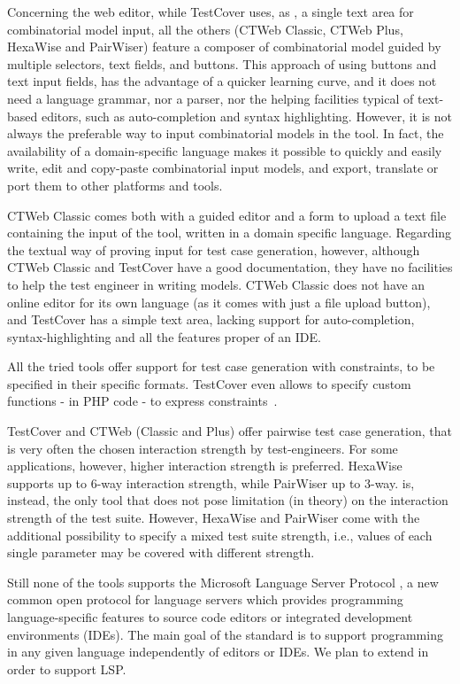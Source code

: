\begin{tikzborder}{\cite{Gargantini16:validation}}
\begin{tikzborder}{\cite{gargantini_combinatorial_2017}}
\begin{tikzborder}{\cite{garn2019}}
\begin{tikzborder}{\cite{arcaini2019achieving}}
\begin{tikzborder}{}
Concerning the web editor, while TestCover uses, as \ctwedge, a single text area for combinatorial model input,  all the others (CTWeb Classic, CTWeb Plus, HexaWise and PairWiser) feature a composer of combinatorial model guided by multiple selectors, text fields, and buttons. This approach of using buttons and text input fields, has the advantage of a quicker learning curve, and it does not need a language grammar, nor a parser, nor the helping facilities typical of text-based editors, such as auto-completion and syntax highlighting. However, it is not always the preferable way to input combinatorial models in the tool. In fact, the availability of a domain-specific language makes it possible to quickly and easily write, edit and copy-paste combinatorial input models, and export, translate or port them to other platforms and tools.


CTWeb Classic comes both with a guided editor and a form to upload a text file containing the input of the tool, written in a domain specific language. Regarding the textual way of proving input for test case generation, however, although CTWeb Classic and TestCover have a good documentation, they have no facilities to help the test engineer in writing models. CTWeb Classic does not have an online editor for its own language (as it comes with just a file upload button), and TestCover has a simple text area, lacking support for auto-completion, syntax-highlighting and all the features proper of an IDE.

All the tried tools offer support for test case generation with constraints, to be specified in their specific formats.  TestCover even allows to specify custom functions - in PHP code - to express constraints~\cite{sherwood2016embedded}.

TestCover and CTWeb (Classic and Plus) offer pairwise test case generation, that is very often the chosen interaction strength by test-engineers. For some applications, however, higher interaction strength is preferred. HexaWise supports up to 6-way interaction strength, while PairWiser up to 3-way. \ctwedge is, instead, the only tool that does not pose limitation (in theory) on the interaction strength of the test suite. However, HexaWise and PairWiser come with the additional possibility to specify a mixed test suite strength, i.e., values of each single parameter may be covered with different strength.

Still none of the tools supports the Microsoft Language Server Protocol \cite{lsp}, a new common open protocol for language servers which provides programming language-specific features to source code editors or integrated development environments (IDEs). The main goal of the standard is to support programming in any given language independently of editors or IDEs. We plan to extend \ctwedge in order to support LSP.
\end{tikzborder}


\end{tikzborder}
\end{tikzborder}
\end{tikzborder}
\end{tikzborder}
